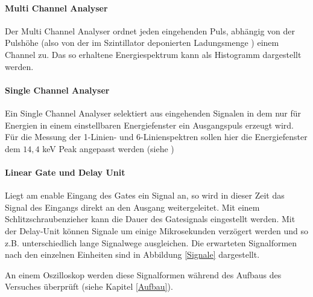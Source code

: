 \paragraph{Multi Channel Analyser}
Der Multi Channel Analyser ordnet jeden eingehenden Puls, abhängig von der Pulshöhe (also von der im Szintillator deponierten Ladungsmenge ) einem Channel zu. Das so erhaltene Energiespektrum kann als Histogramm dargestellt werden.
\paragraph{Single Channel Analyser}
Ein Single Channel Analyser selektiert aus eingehenden Signalen in dem nur für Energien in einem einstellbaren Energiefenster ein Ausgangspuls erzeugt wird.  Für die Messung der 1-Linien- und 6-Linienspektren sollen hier die Energiefenster dem $14,4$ keV Peak angepasst werden (siehe )
\paragraph{Linear Gate und Delay Unit}
Liegt am enable Eingang des Gates ein Signal an, so wird in dieser Zeit das Signal des
Eingangs direkt an den Ausgang weitergeleitet. Mit einem Schlitzschraubenzieher kann
die Dauer des Gatesignals eingestellt werden. Mit der Delay-Unit können Signale um einige Mikrosekunden verzögert werden und so z.B. unterschiedlich lange Signalwege ausgleichen.
Die erwarteten Signalformen nach den einzelnen Einheiten sind in Abbildung \ref{Signale}    dargestellt.


An einem Oszilloskop werden diese Signalformen während des Aufbaus des Versuches überprüft (siehe Kapitel \ref{Aufbau}).
